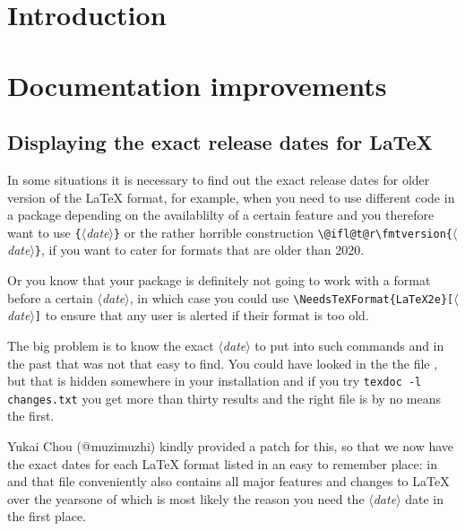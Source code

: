 \documentclass{ltnews}
\providecommand\Dash {\unskip \textemdash}
\providecommand\meta[1]{$\langle$\textrm{\itshape#1}$\rangle$}
\providecommand\tubcommand[1]{}
\begin{document}
\tubcommand{\addtolength\textheight{4.2pc}}   %

\maketitle
{  \spaceskip=3.33pt 
\tableofcontents}

\setlength{}


\medskip


\section{Introduction}


\section{Documentation improvements}


\subsection{Displaying the exact release dates for \LaTeX{}}

In some situations it is necessary to find out the exact release dates
for older version of the \LaTeX{} format, for example, when you need
to use different code in a package depending on the availablilty of a
certain feature and you therefore want to use
\texttt\{\meta{date}\texttt\} or the
rather horrible construction \verb/\@ifl@t@r\fmtversion{/\meta{date}\texttt\},
if you
want to cater for formats that are older than 2020.

Or you know that your package is definitely not going to work with a
format before a certain \meta{date}, in which case you could use
\verb/\NeedsTeXFormat{LaTeX2e}[/\meta{date}\texttt] to ensure that any
  user is alerted if their format is too old.

The big problem is to know the exact \meta{date} to put into such
commands and in the past that was not that easy to find. You could have 
looked in the the file , but that is hidden somewhere
in your installation and if you try
\verb*/texdoc -l changes.txt/ you get more than thirty results and the
right file is by no means the first.

Yukai Chou (\textsf{@muzimuzhi}) kindly provided a patch for this, so that we now have
the exact dates for each \LaTeX{} format listed in an easy to remember
place: in  and that file conveniently also contains all major
features and changes to \LaTeX{} over the years\Dash one of which is
most likely the reason you need the \meta{date} date in the first
place.
\end{document}
